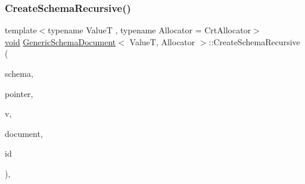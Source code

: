 \mbox{\label{classGenericSchemaDocument_a8f07ad5a43a7b70ecdaf362463544f25}} 
\subsubsection{\texorpdfstring{Create\+Schema\+Recursive()}{CreateSchemaRecursive()}}
{\footnotesize\ttfamily template$<$typename ValueT , typename Allocator  = Crt\+Allocator$>$ \\
\hyperlink{imgui__impl__opengl3__loader_8h_ac668e7cffd9e2e9cfee428b9b2f34fa7}{void} \hyperlink{classGenericSchemaDocument}{Generic\+Schema\+Document}$<$ ValueT, Allocator $>$\+::Create\+Schema\+Recursive (\begin{DoxyParamCaption}\item[{const \hyperlink{classGenericSchemaDocument_acaf115202b159a2eb72c97c3dc6c3895}{Schema\+Type} $\ast$$\ast$}]{schema,  }\item[{const \hyperlink{classGenericSchemaDocument_aeb62f562d4dc024402b00f97cbcef747}{Pointer\+Type} \&}]{pointer,  }\item[{const \hyperlink{classGenericSchemaDocument_ae246f1b6573a5a8a2c0d73d4eb64d53a}{Value\+Type} \&}]{v,  }\item[{const \hyperlink{classGenericSchemaDocument_ae246f1b6573a5a8a2c0d73d4eb64d53a}{Value\+Type} \&}]{document,  }\item[{const \hyperlink{classGenericSchemaDocument_afcfefaab7eecec6849d478557392e23c}{Uri\+Type} \&}]{id }\end{DoxyParamCaption})\hspace{0.3cm}{\ttfamily [inline]}, {\ttfamily [private]}}

\mbox{\label{classGenericSchemaDocument_a69ee6ba6de390d1fad9bf5e359997f8e}} 
